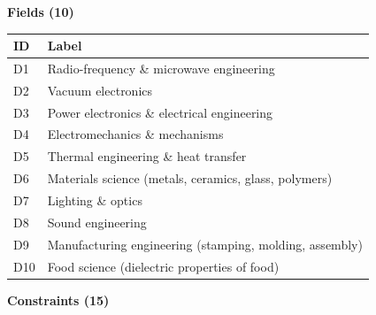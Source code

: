 \textbf{Fields (10)}

\begin{longtable}[]{@{}ll@{}}
\toprule\noalign{}
ID & Label \\
\midrule\noalign{}
\endhead
\bottomrule\noalign{}
\endlastfoot
D1 & Radio-frequency \& microwave engineering \\
D2 & Vacuum electronics \\
D3 & Power electronics \& electrical engineering \\
D4 & Electromechanics \& mechanisms \\
D5 & Thermal engineering \& heat transfer \\
D6 & Materials science (metals, ceramics, glass, polymers) \\
D7 & Lighting \& optics \\
D8 & Sound engineering \\
D9 & Manufacturing engineering (stamping, molding, assembly) \\
D10 & Food science (dielectric properties of food) \\
\end{longtable}

\textbf{Constraints (15)}

